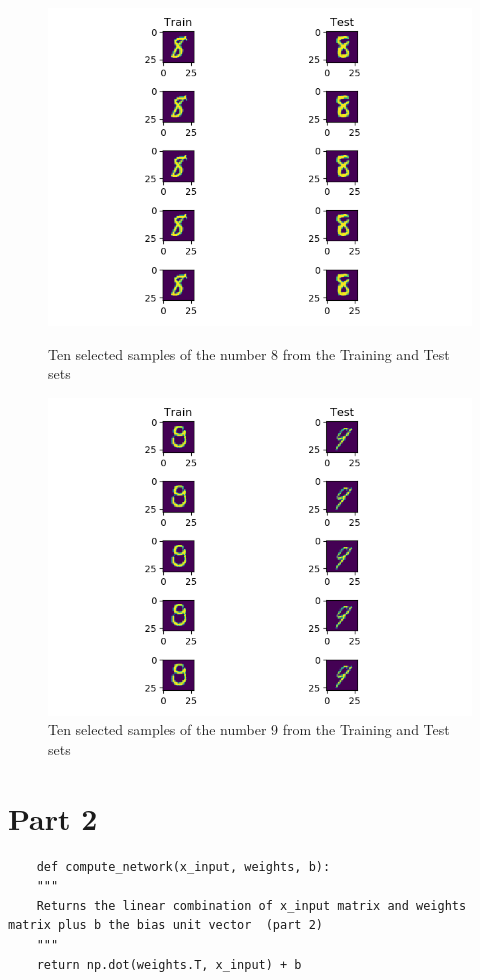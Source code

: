 \documentclass[10pt,letterpaper]{article}
\begin{document}
	\begin{figure}[H]
		\centering
		\includegraphics[width=\linewidth]{imgs/digit-8}
		\caption{Ten selected samples of the number 8 from the Training and Test sets}
		\label{fig:digit-8}
		\endminipage\hfill
		\centering
		\includegraphics[width=\linewidth]{imgs/digit-9}
		\caption{Ten selected samples of the number 9 from the Training and Test sets}
		\label{fig:digit-9}
		\endminipage\hfill
	\end{figure}

	\section{Part 2}
	\begin{lstlisting}
	def compute_network(x_input, weights, b):
	"""
	Returns the linear combination of x_input matrix and weights matrix plus b the bias unit vector  (part 2)
	"""
	return np.dot(weights.T, x_input) + b
	\end{lstlisting}
\end{document}
